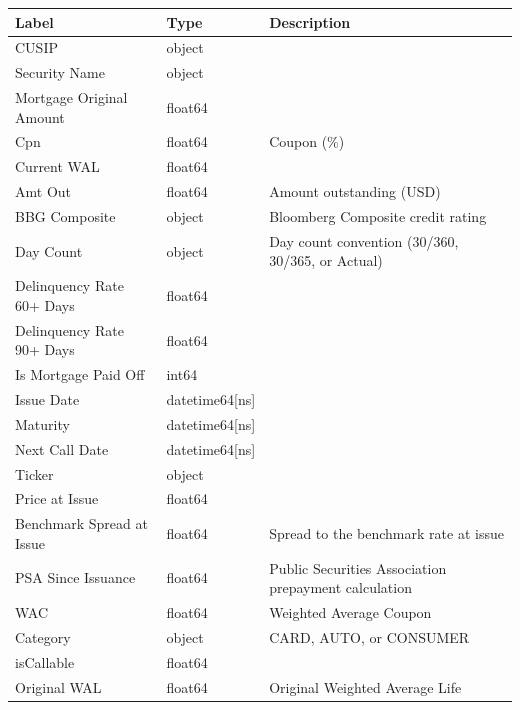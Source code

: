 \documentclass{article}
\begin{document}
\begin{table}[h]
  \small\centering
  \begin{floatrow}
   {\begin{tabular}{lll}
\toprule
Label &               Type  & Description \\
\midrule
CUSIP                     &          object & \\
Security Name             &          object & \\
Mortgage Original Amount  &         float64 & \\
Cpn                       &         float64 & Coupon (\%)\\
Current WAL               &         float64 & \\
Amt Out                   &         float64 & Amount outstanding (USD) \\
BBG Composite             &          object & Bloomberg Composite credit rating \\
Day Count                 &          object &  Day count convention (30/360, 30/365, or Actual) \\
Delinquency Rate 60+ Days &         float64 & \\
Delinquency Rate 90+ Days &         float64 & \\
Is Mortgage Paid Off      &           int64 & \\
Issue Date                &  datetime64[ns] & \\
Maturity                  &  datetime64[ns] & \\
Next Call Date            &  datetime64[ns] & \\
Ticker                    &          object & \\
Price at Issue            &         float64 & \\
Benchmark Spread at Issue &         float64 & Spread to the benchmark rate at issue \\
PSA Since Issuance        &         float64 & Public Securities Association prepayment calculation \\
WAC                       &         float64 & Weighted Average Coupon \\
Category                  &          object & CARD, AUTO, or CONSUMER \\
isCallable                &         float64 & \\
Original WAL              &         float64 & Original Weighted Average Life \\
\bottomrule
\end{tabular}}
  \end{floatrow}
\end{table}
\end{document}
